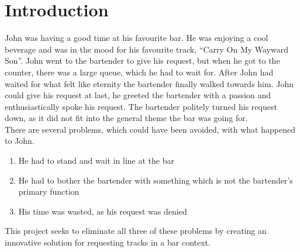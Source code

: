 \chapter{Introduction}
John was having a good time at his favourite bar. He was enjoying a cool beverage and was in the mood for his favourite track, \enquote{Carry On My Wayward Son}. John went to the bartender to give his request, but when he got to the counter, there was a large queue, which he had to wait for. After John had waited for what felt like eternity the bartender finally walked towards him. John could give his request at last, he greeted the bartender with a passion and enthusiastically spoke his request. The bartender politely turned his request down, as it did not fit into the general theme the bar was going for.\\

There are several problems, which could have been avoided, with what happened to John.
\begin{enumerate}
	\item He had to stand and wait in line at the bar
	\item He had to bother the bartender with something which is not the bartender's primary function
	\item His time was wasted, as his request was denied
\end{enumerate}
This project seeks to eliminate all three of these problems by creating an innovative solution for requesting tracks in a bar context.
